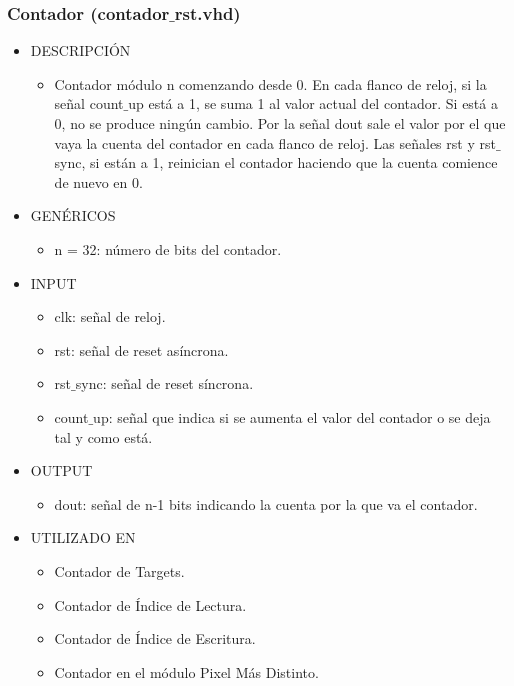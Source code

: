 \subsubsection{Contador (contador$\_$rst.vhd)}

\begin{itemize}
    \item DESCRIPCIÓN
        \begin{itemize}
            \item Contador módulo n comenzando desde 0. En cada flanco de reloj, si la señal count$\_$up está a 1, se suma 1 al valor actual del contador. Si está a 0, no se produce ningún cambio. Por la señal dout sale el valor por el que vaya la cuenta del contador en cada flanco de reloj. Las señales rst y rst$\_$sync, si están a 1, reinician el contador haciendo que la cuenta comience de nuevo en 0.
        \end{itemize}
    \item GENÉRICOS
        \begin{itemize}
            \item n = 32: número de bits del contador.
        \end{itemize}
    \item INPUT
        \begin{itemize}
            \item clk: señal de reloj.
            \item rst: señal de reset asíncrona.
            \item rst$\_$sync: señal de reset síncrona.
            \item count$\_$up: señal que indica si se aumenta el valor del contador o se deja tal y como está.
        \end{itemize}
    \item OUTPUT
        \begin{itemize}
            \item dout: señal de n-1 bits indicando la cuenta por la que va el contador.
        \end{itemize}
    \item UTILIZADO EN
        \begin{itemize}
            \item Contador de Targets.
            \item Contador de Índice de Lectura.
            \item Contador de Índice de Escritura.
            \item Contador en el módulo Pixel Más Distinto.
        \end{itemize}
\end{itemize}

